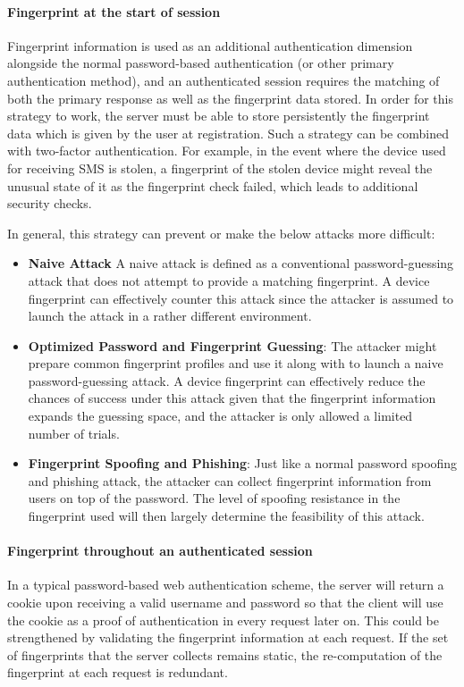 \documentclass{acm_proc_article-sp}
\begin{document}
\paragraph{Fingerprint at the start of session}
Fingerprint information is used as an additional authentication dimension alongside the normal password-based authentication (or other primary authentication method), and an authenticated session requires the matching of both the primary response as well as the fingerprint data stored.
In order for this strategy to work, the server must be able to store persistently the fingerprint data which is given by the user at registration. 
Such a strategy can be combined with two-factor authentication. For example, in the event where the device used for receiving SMS is stolen, a fingerprint of the stolen device might reveal the unusual state of it as the fingerprint check failed, which leads to additional security checks.

In general, this strategy can prevent or make the below attacks more difficult: 
\begin{itemize}
    \item \textbf{Naive Attack} A naive attack is defined as a conventional password-guessing attack that does not attempt to provide a matching fingerprint. A device fingerprint can effectively counter this attack since the attacker is assumed to launch the attack in a rather different environment. 
    \item \textbf{Optimized Password and Fingerprint Guessing}: The attacker might prepare common fingerprint profiles and use it along with to launch a naive password-guessing attack. A device fingerprint can effectively reduce the chances of success under this attack given that the fingerprint information expands the guessing space, and the attacker is only allowed a limited number of trials. 
    \item \textbf{Fingerprint Spoofing and Phishing}: Just like a normal password spoofing and phishing attack, the attacker can collect fingerprint information from users on top of the password. The level of spoofing resistance in the fingerprint used will then largely determine the feasibility of this attack. 
\end{itemize}

\paragraph{Fingerprint throughout an authenticated session}
In a typical password-based web authentication scheme, the server will return a cookie upon receiving a valid username and password so that the client will use the cookie as a proof of authentication in every request later on. This could be strengthened by validating the fingerprint information at each request. If the set of fingerprints that the server collects remains static, the re-computation of the fingerprint at each request is redundant.
\end{document}
